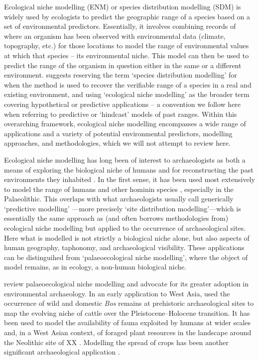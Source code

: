 \documentclass[
  authoryear,
  review]{elsarticle}
\begin{document}
Ecological niche modelling (ENM) or species distribution modelling (SDM)
is widely used by ecologists to predict the geographic range of a
species based on a set of environmental predictors. Essentially, it
involves combining records of where an organism has been observed with
environmental data (climate, topography, etc.) for those locations to
model the range of environmental values at which that species -- its
environmental niche. This model can then be used to predict the range of
the organism in question either in the same or a different environment.
\citet{CITE} suggests reserving the term `species distribution
modelling' for when the method is used to recover the verifiable range
of a species in a real and existing environment, and using `ecological
niche modelling' as the broader term covering hypothetical or predictive
applications -- a convention we follow here when referring to predictive
or `hindcast' models of past ranges. Within this overarching framework,
ecological niche modelling encompasses a wide range of applications and
a variety of potential environmental predictors, modelling approaches,
and methodologies, which we will not attempt to review here.

Ecological niche modelling has long been of interest to archaeologists
as both a means of exploring the biological niche of humans and for
reconstructing the past environments they inhabited
\citep{DavidPollyEronen2011, FranklinEtAl2015}. In the first sense, it
has been used most extensively to model the range of humans and other
hominin species
\citep[e.g.][]{BenitoEtAl2017, YousefiEtAl2020, BanksEtAl2021, YaworskyEtAl2024a, YaworskyEtAl2024b, GuranEtAl2024},
especially in the Palaeolithic. This overlaps with what archaeologists
usually call generically `predictive modelling'
\citep{VerhagenWhitley2020}---more precisely `site distribution
modelling'---which is essentially the same approach as (and often
borrows methodologies from) ecological niche modelling but applied to
the occurrence of archaeological sites. Here what is modelled is not
strictly a biological niche alone, but also aspects of human geography,
taphonomy, and archaeological visibility. These applications can be
distinguihed from `palaeoecological niche modelling', where the object
of model remains, as in ecology, a non-human biological niche.

\citet{FranklinEtAl2015} review palaeoecological niche modelling and
advocate for its greater adoption in environmental archaeology. In an
early application to West Asia, \citet{ConollyEtAl2012} used the
occurrence of wild and domestic \emph{Bos} remains at prehistoric
archaeological sites to map the evolving niche of cattle over the
Pleistocene--Holocene transition. It has been used to model the
availability of fauna exploited by humans at wider scales
\citep[e.g.][]{deAndresHerreroEtAl2018, YaworksyEtAl2023} and, in a West
Asian context, of foraged plant resources in the landscape around the
Neolithic site of XX \citep{CollinsEtAl2018}. Modelling the spread of
crops has been another significant archaeological application
\citep{CremaEtAl}.
\end{document}
